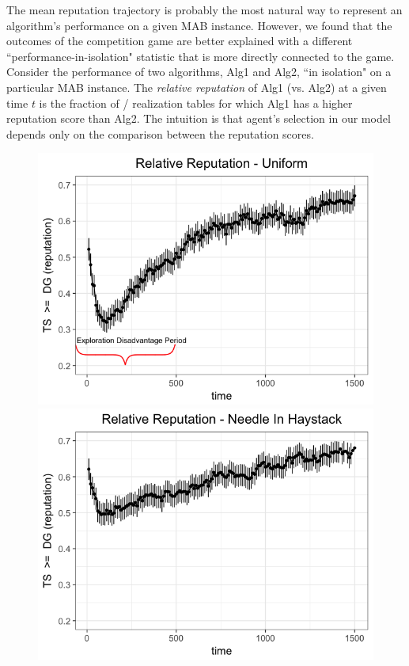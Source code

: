 \documentclass[../competing_bandits.tex]{subfiles}
\begin{document}
The mean reputation trajectory is probably the most natural way to represent an algorithm's performance on a given MAB instance. However, we found that the outcomes of the competition game are better explained with a different ``performance-in-isolation" statistic that is more directly connected to the game. Consider the  performance of two algorithms, Alg1 and Alg2, ``in isolation" on a particular MAB instance. The \emph{relative reputation} of Alg1 (vs. Alg2) at a given time $t$ is the fraction of \MRVs / realization tables for which Alg1 has a higher reputation score than Alg2. The intuition is that agent's selection in our model depends only on the comparison between the reputation scores.

\begin{figure}[ht]
\includegraphics[scale=0.35]{figures/relative_uniform_annotated_plot}
\includegraphics[scale=0.35]{figures/relative_nih_ts_dg.png}

\end{figure}
\end{document}
